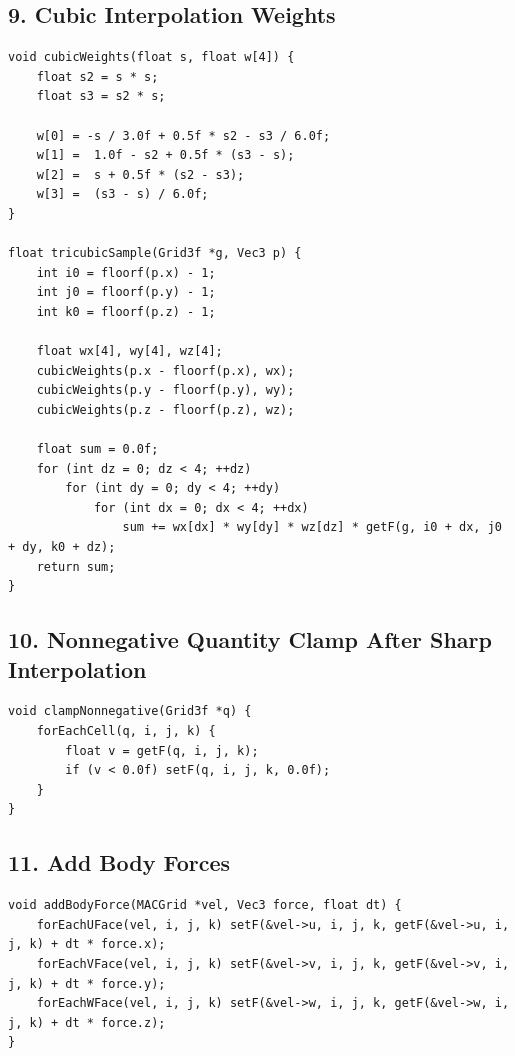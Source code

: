 \documentclass[10pt,letterpaper]{article}
\begin{document}
\subsection*{9. Cubic Interpolation Weights}

\begin{verbatim}
void cubicWeights(float s, float w[4]) {
    float s2 = s * s;
    float s3 = s2 * s;

    w[0] = -s / 3.0f + 0.5f * s2 - s3 / 6.0f;
    w[1] =  1.0f - s2 + 0.5f * (s3 - s);
    w[2] =  s + 0.5f * (s2 - s3);
    w[3] =  (s3 - s) / 6.0f;
}

float tricubicSample(Grid3f *g, Vec3 p) {
    int i0 = floorf(p.x) - 1;
    int j0 = floorf(p.y) - 1;
    int k0 = floorf(p.z) - 1;

    float wx[4], wy[4], wz[4];
    cubicWeights(p.x - floorf(p.x), wx);
    cubicWeights(p.y - floorf(p.y), wy);
    cubicWeights(p.z - floorf(p.z), wz);

    float sum = 0.0f;
    for (int dz = 0; dz < 4; ++dz)
        for (int dy = 0; dy < 4; ++dy)
            for (int dx = 0; dx < 4; ++dx)
                sum += wx[dx] * wy[dy] * wz[dz] * getF(g, i0 + dx, j0 + dy, k0 + dz);
    return sum;
}
\end{verbatim}

\subsection*{10. Nonnegative Quantity Clamp After Sharp Interpolation}

\begin{verbatim}
void clampNonnegative(Grid3f *q) {
    forEachCell(q, i, j, k) {
        float v = getF(q, i, j, k);
        if (v < 0.0f) setF(q, i, j, k, 0.0f);
    }
}
\end{verbatim}

\subsection*{11. Add Body Forces}

\begin{verbatim}
void addBodyForce(MACGrid *vel, Vec3 force, float dt) {
    forEachUFace(vel, i, j, k) setF(&vel->u, i, j, k, getF(&vel->u, i, j, k) + dt * force.x);
    forEachVFace(vel, i, j, k) setF(&vel->v, i, j, k, getF(&vel->v, i, j, k) + dt * force.y);
    forEachWFace(vel, i, j, k) setF(&vel->w, i, j, k, getF(&vel->w, i, j, k) + dt * force.z);
}
\end{verbatim}
\end{document}
